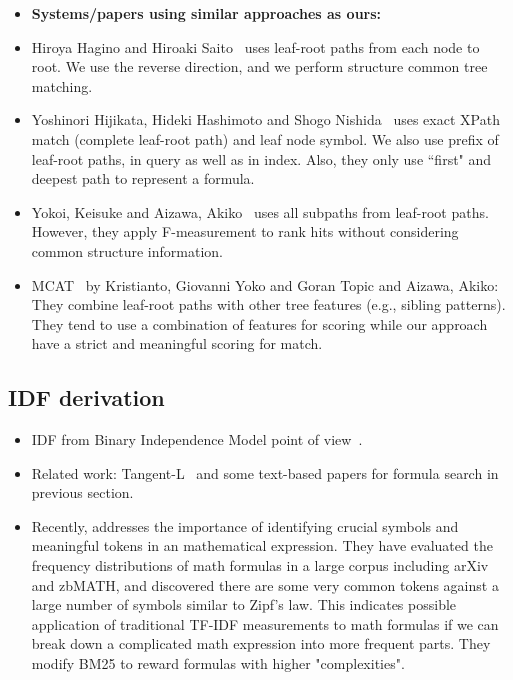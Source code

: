 \documentclass[11pt]{artikel3}
\begin{document}
\begin{itemize}
\item \textbf{Systems/papers using similar approaches as ours:}
\item Hiroya Hagino and Hiroaki Saito~\cite{hagino2013partial} uses leaf-root paths from each node to root. We use the reverse direction, and we perform structure common tree matching.
\item Yoshinori Hijikata, Hideki Hashimoto and Shogo Nishida~\cite{hijikata2007investigation, hijikata2009search} uses exact XPath match (complete leaf-root path) and leaf node symbol. We also use prefix of leaf-root paths, in query as well as in index. Also, they only use ``first" and deepest path to represent a formula.
\item Yokoi, Keisuke and Aizawa, Akiko~\cite{yokoi2009approach} uses all subpaths from leaf-root paths. However, they apply F-measurement to rank hits without considering common structure information.
\item MCAT~\cite{kristianto2016mcat} by Kristianto, Giovanni Yoko and Goran Topic and Aizawa, Akiko: They combine leaf-root paths with other tree features (e.g., sibling patterns). They tend to use a combination of features for scoring while our approach have a strict and meaningful scoring for match.
\end{itemize}


\subsection{IDF derivation}
\begin{itemize}
\item IDF from Binary Independence Model point of view~\cite{manning2008introduction, croft2010search, buttcher2016information}.
\item Related work: Tangent-L~\cite{fraser2018choosing} and some text-based papers for formula search in previous section.
\item Recently, \cite{greiner2020discovering} addresses the importance of identifying crucial symbols and meaningful tokens in an mathematical expression. They have evaluated the frequency distributions of math formulas in a large corpus including arXiv and zbMATH, and discovered there are some very common tokens against a large number of symbols similar to Zipf's law. This indicates possible application of traditional TF-IDF measurements to math formulas if we can break down a complicated math expression into more frequent parts. They modify BM25 to reward formulas with higher "complexities".
\end{itemize}
\end{document}
